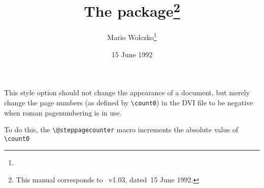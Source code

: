 \documentclass[pagesize=auto, fontsize=14pt, DIV=9, parskip=half]{scrartcl}
\title{The \pkg{romanneg} package\thanks{This manual corresponds to \pkg{romanneg.sty}~v1.03, dated~15 June 1992.}}
\author{Mario Wolczko\thanks{\mail{mario@acm.org}}}
\date{15 June 1992}
\begin{document}
\maketitle

This style option should not change the appearance of a document,
but merely change the page numbers (as defined by \verb|\count0|) in the
DVI file to be negative when roman pagenumbering is in use.

To do this, the \verb|\@steppagecounter| macro increments the absolute
value of \verb|\count0|
\end{document}
